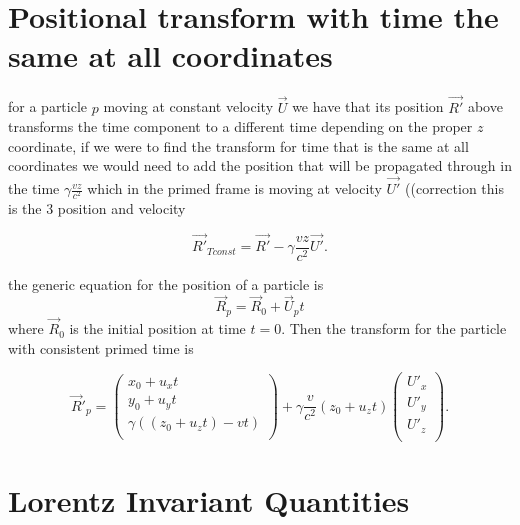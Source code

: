 \section{Positional transform with time the same at all coordinates}

for a particle $p$ moving at constant velocity $\Vec{U}$ we have that its position $\Vec{R'}$ above transforms the time component to a different time depending on the proper $z$ coordinate, if we were to find the transform for time that is the same at all coordinates we would need to add the position that will be propagated through in the time $\gamma \frac{vz}{c^2}$ which in the primed frame is moving at velocity $\Vec{U'}$ ((correction this is the 3 position and velocity

\begin{equation}%
\label{Generalised spacial transform}
    \Vec{R'}_{Tconst} = \Vec{R'} - \gamma \frac{vz}{c^2} \Vec{U'}.
\end{equation}%

the generic equation for the position of a particle is
\begin{equation}%
    \Vec{R}_p = \Vec{R}_0 +\Vec{U}_p t
\end{equation}%
where $\Vec{R}_0$ is the initial position at time $t=0$.
Then the transform for the particle with consistent primed time is

\begin{equation}%
\label{Particle transformation}
    \Vec{R}'_p = \begin{pmatrix}
    x_0 + u_{x} t\\ y_0 + u_{y} t \\ \gamma \left( (z_0 + u_{z} t) - vt \right) \\
    \end{pmatrix} + \gamma\dfrac{v}{c^2} \left(z_0 + u_{z} t\right) 
    \begin{pmatrix}
    U'_{x} \\ U'_{y} \\ U'_{z} \\
    \end{pmatrix}.
\end{equation}%

\section{Lorentz Invariant Quantities}


